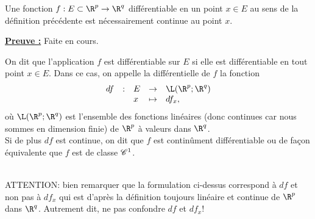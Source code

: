 \documentclass[class=report,crop=false]{standalone}
\begin{document}
 \begin{proposition}
\textcolor[rgb]{0.50,0.00,0.25}{
Une fonction $f: E \subset \R^p \rightarrow \R^q$ différentiable en un point $x \in E$ 
au sens de la définition précédente est nécessairement continue au point $x$.
}
\end{proposition}


\noindent \underline{\bf Preuve :}
Faite en cours.

\begin{definition}
\textcolor[rgb]{0.73,0.00,0.00}{
On dit que l'application $f$ est différentiable sur $E$ si elle est différentiable en tout point
$x \in E$. Dans ce cas, on appelle la différentielle de $f$ la fonction
  \begin{equation*}
    \begin{array}{cllll}
      df & : & E & \rightarrow  & \L(\R^p;\R^q) \\
       & & x  & \mapsto & df_x,
    \end{array}
  \end{equation*}
  où $\L(\R^p;\R^q)$ est l'ensemble des fonctions linéaires (donc continues car nous 
  sommes en dimension finie) de $\R^p$ à valeurs dans $\R^q$.\\
  Si de plus $df$ est continue, on dit que $f$ est continûment différentiable ou de
  façon équivalente que $f$ est de classe $\mathscr{C}^1$.
}
 \end{definition}
 
   \begin{remarque*}
\textcolor[rgb]{0.00,0.00,1.00}{ \\
ATTENTION: bien remarquer que la formulation ci-dessus correspond à $df$ et non pas 
à $df_x$ qui est d'après la définition toujours linéaire et continue de $\R^p$ dans $\R^q$.
Autrement dit, ne pas confondre $df$ et $df_x$!\\
}
\end{remarque*}
\end{document}
